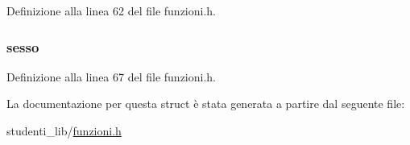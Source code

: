 Definizione alla linea 62 del file funzioni.\+h.

\hypertarget{structstudenti_a66c70a3a36fe5a277a901c6ecce3383d}{
\subsubsection[{sesso}]{ sesso}}\label{structstudenti_a66c70a3a36fe5a277a901c6ecce3383d}


Definizione alla linea 67 del file funzioni.\+h.



La documentazione per questa struct è stata generata a partire dal seguente file\+:\begin{DoxyCompactItemize}
\item 
studenti\+\_\+lib/\hyperlink{funzioni_8h}{funzioni.\+h}\end{DoxyCompactItemize}
